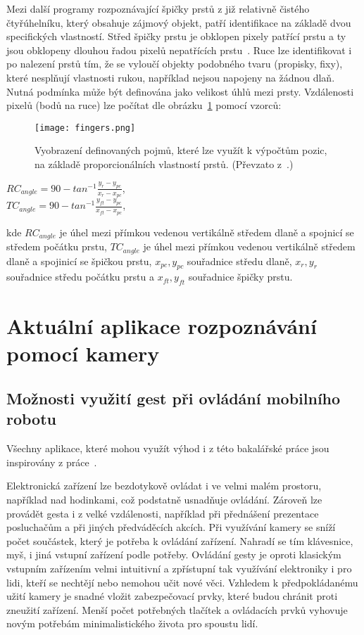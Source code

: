 Mezi další programy rozpoznávající špičky prstů z již relativně čistého čtyřúhelníku, který obsahuje zájmový objekt, patří identifikace na základě dvou specifických vlastností. Střed špičky prstu je obklopen pixely patřící prstu a ty jsou obklopeny dlouhou řadou pixelů nepatřících prstu~\cite{14}. Ruce lze identifikovat i po nalezení prstů tím, že se vyloučí objekty podobného tvaru (propisky, fixy), které nesplňují vlastnosti rukou, například nejsou napojeny na žádnou dlaň. Nutná podmínka může být definována jako velikost úhlů mezi prsty. Vzdálenosti pixelů (bodů na ruce) lze počítat dle obrázku~\ref{pic8} pomocí vzorců: 

\begin{figure}[h]
\centering
\texttt{[image: fingers.png]}
\caption{Vyobrazení definovaných pojmů, které lze využít k výpočtům pozic, na základě proporcionálních vlastností prstů.
(Převzato z~\cite{13}.) }
\label{pic8}
\end{figure}

\begin{center}
$RC_{angle} = 90 - tan^{-1} \frac{y_{r}-y_{pc}}{x_{r} - x_{pc}}$, \\
$TC_{angle} = 90 - tan^{-1} \frac{y_{ft}-y_{pc}}{x_{ft} - x_{pc}}$, 
\end{center}
kde $ RC_{angle} $ je úhel mezi přímkou vedenou vertikálně středem dlaně a spojnicí se středem počátku prstu, $ TC_{angle} $ je úhel mezi přímkou vedenou vertikálně středem dlaně a spojinicí se špičkou prstu, $ x_{pc}, y_{pc} $ souřadnice středu dlaně, $ x_{r}, y_{r} $ souřadnice středu počátku prstu a $ x_{ft}, y_{ft} $ souřadnice špičky prstu.

\newpage
\section{Aktuální aplikace rozpoznávání pomocí kamery}
\subsection{Možnosti využití gest při ovládání mobilního robotu}
Všechny aplikace, které mohou využít výhod i z této bakalářské práce jsou inspirovány z práce~\cite{14}.

Elektronická zařízení lze bezdotykově ovládat i ve velmi malém prostoru, například nad hodinkami, což podstatně usnadňuje ovládání. Zároveň lze provádět gesta i z velké vzdálenosti, například při přednášení prezentace posluchačům a při jiných předváděcích akcích.
Při využívání kamery se sníží počet součástek, který je potřeba k ovládání zařízení. Nahradí se tím klávesnice, myš, i jiná vstupní zařízení podle potřeby. 
Ovládání gesty je oproti klasickým vstupním zařízením velmi intuitivní a zpřístupní tak využívání elektroniky i pro lidi, kteří se nechtějí nebo nemohou učit nové věci.
Vzhledem k předpokládanému užití kamery je snadné vložit zabezpečovací prvky, které budou chránit proti zneužití zařízení.
Menší počet potřebných tlačítek a ovládacích prvků vyhovuje novým potřebám minimalistického života pro spoustu lidí.

